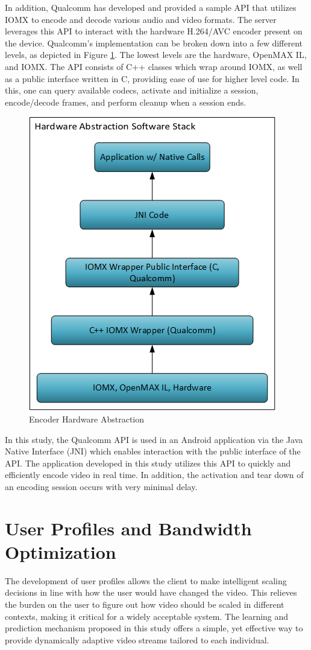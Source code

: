 \documentclass[3p,times,procedia]{elsarticle}
\begin{document}
In addition, Qualcomm has developed and provided a sample API that utilizes IOMX to encode and decode various audio and video formats. The server leverages this API to interact with the hardware H.264/AVC encoder present on the device. Qualcomm's implementation can be broken down into a few different levels, as depicted in Figure \ref{fig:QualcommAPI}. The lowest levels are the hardware, OpenMAX IL, and IOMX. The API consists of C++ classes which wrap around IOMX, as well as a public interface written in C, providing ease of use for higher level code. In this, one can query available codecs, activate and initialize a session, encode/decode frames, and perform cleanup when a session ends.
\begin{figure}[H]
\centering
\includegraphics[width=0.4\linewidth]{QualcommAPI.png}
\caption{Encoder Hardware Abstraction}
\label{fig:QualcommAPI}
\end{figure}
In this study, the Qualcomm API is used in an Android application via the Java Native Interface (JNI) which enables interaction with the public interface of the API. The application developed in this study utilizes this API to quickly and efficiently encode video in real time. In addition, the activation and tear down of an encoding session occurs with very minimal delay.


\section{User Profiles and Bandwidth Optimization}
\label{sec:UserProfiles}

The development of user profiles allows the client to make intelligent scaling decisions in line with how the user would have changed the video. This relieves the burden on the user to figure out how video should be scaled in different contexts, making it critical for a widely acceptable system. The learning and prediction mechanism proposed in this study offers a simple, yet effective way to provide dynamically adaptive video streams tailored to each individual.
\end{document}
